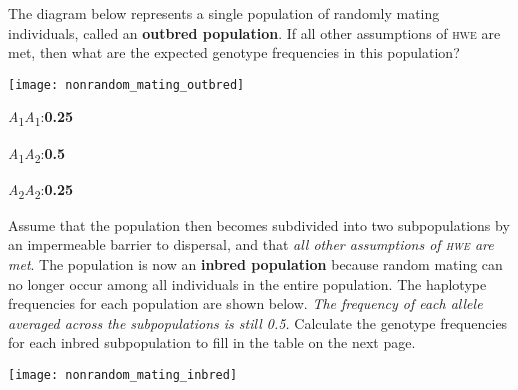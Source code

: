 \documentclass[11pt, addpoints]{exam}
\begin{document}
\begin{questions}

\question[1]
The diagram below represents a single population of randomly
mating individuals, called an \textbf{outbred population}. If all other assumptions of \textsc{hwe} are met, then what
are the expected genotype frequencies in this population?

\begin{center}
	\texttt{[image: nonrandom\_mating\_outbred]}
\end{center}

\qquad\emph{A}\textsubscript{1}\emph{A}\textsubscript{1}:\ifprintanswers\quad\textbf{0.25}\fi\vspace{\baselineskip}

\qquad\emph{A}\textsubscript{1}\emph{A}\textsubscript{2}:\ifprintanswers\quad\textbf{0.5}\fi\vspace{\baselineskip}

\qquad\emph{A}\textsubscript{2}\emph{A}\textsubscript{2}:\ifprintanswers\quad\textbf{0.25}\fi\vspace{0.5\baselineskip}



\question[3]
Assume that the population then becomes subdivided into two
subpopulations by an impermeable barrier to dispersal, and that
\emph{all other assumptions of \textsc{hwe} are met}. The population is now an \textbf{inbred population} because random mating can no longer occur among all individuals in the entire population. The haplotype frequencies
for each population are shown below. \textit{The frequency of each allele averaged across the subpopulations is still 0.5.} Calculate the genotype frequencies
for each inbred subpopulation to fill in the table on the next page.

\begin{center}
	\texttt{[image: nonrandom\_mating\_inbred]}
\end{center}


\end{questions}
\end{document}
